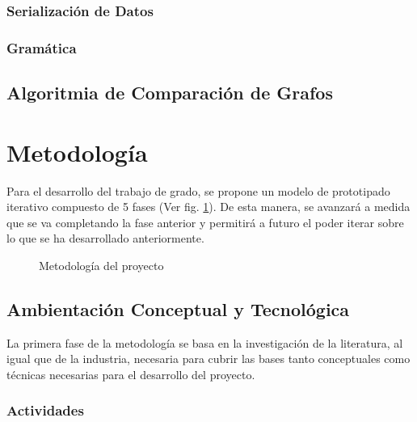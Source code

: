\documentclass[12pt]{article}
\begin{document}
    \subsubsection{Serialización de Datos}

    
    \subsubsection{Gramática}


    \subsection{Algoritmia de Comparación de Grafos} %



    \pagebreak

    \section{Metodología}

    Para el desarrollo del trabajo de grado, se propone un modelo de prototipado iterativo compuesto de 5 fases (Ver fig. \ref{fig:met}). De esta manera, se avanzará a medida que se va completando la fase anterior y permitirá a futuro el poder iterar sobre lo que se ha desarrollado anteriormente.

    \begin{figure}[H]
        \centering
        
        \caption{Metodología del proyecto}
        \label{fig:met}
    \end{figure}

    \subsection{Ambientación Conceptual y Tecnológica}

    La primera fase de la metodología se basa en la investigación de la literatura, al igual que de la industria, necesaria para cubrir las bases tanto conceptuales como técnicas necesarias para el desarrollo del proyecto. 

    \subsubsection*{Actividades}
\end{document}
